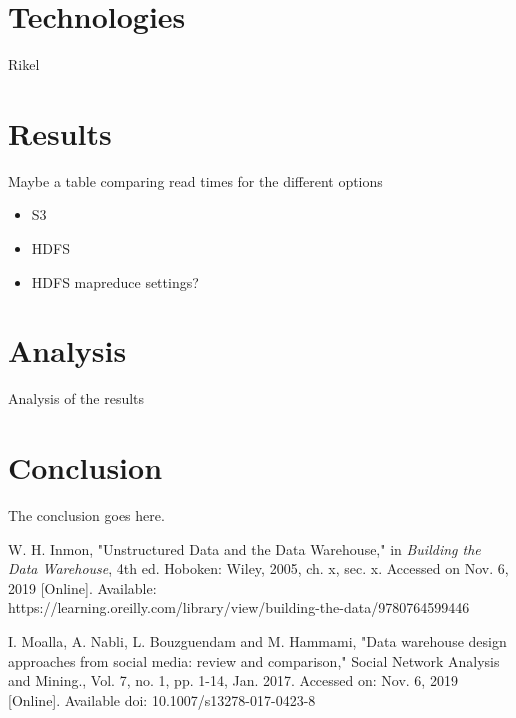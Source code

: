 \documentclass[journal]{IEEEtran}
\begin{document}
\section{Technologies}

Rikel

\section{Results}



Maybe a table comparing read times for the different options

\begin{itemize}
	\item S3
	\item HDFS
	\item HDFS mapreduce settings?
\end{itemize}

\section{Analysis}

Analysis of the results


\section{Conclusion}

The conclusion goes here.

\ifCLASSOPTIONcaptionsoff
  \newpage
\fi

\begin{thebibliography}{1}

W. H. Inmon, "Unstructured Data and the Data Warehouse," in 
  \emph{Building the Data Warehouse},
  4th ed. Hoboken: Wiley, 2005, ch. x, sec. x.
  Accessed on Nov. 6, 2019 [Online]. 
  Available: \\ https://learning.oreilly.com/library/view/building-the-data/9780764599446

I. Moalla, A. Nabli, L. Bouzguendam and M. Hammami,
 "Data warehouse design approaches from social media: review and comparison,"
 Social Network Analysis and Mining., Vol. 7, no. 1, pp. 1-14, Jan. 2017.
 Accessed on: Nov. 6, 2019 [Online]. Available doi: 10.1007/s13278-017-0423-8

\end{thebibliography}


\end{document}
